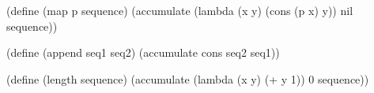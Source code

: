 \begtt\scm
(define (map p sequence)
  (accumulate (lambda (x y) (cons (p x) y)) nil sequence))

(define (append seq1 seq2)
  (accumulate cons seq2 seq1))

(define (length sequence)
  (accumulate (lambda (x y) (+ y 1)) 0 sequence))
\endtt
